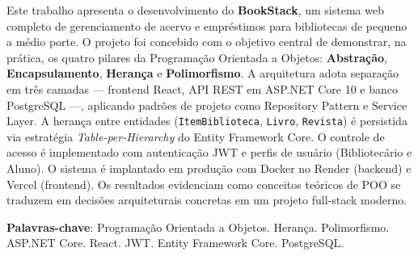 \documentclass[
  12pt,
  a4paper,
  oneside,
  brazil
]{abntex2}
\begin{document}
\frenchspacing
{}

\imprimircapa

\imprimirfolhaderosto

\begin{resumo}
Este trabalho apresenta o desenvolvimento do \textbf{BookStack}, um sistema web completo de gerenciamento de acervo e empréstimos para bibliotecas de pequeno a médio porte. O projeto foi concebido com o objetivo central de demonstrar, na prática, os quatro pilares da Programação Orientada a Objetos: \textbf{Abstração}, \textbf{Encapsulamento}, \textbf{Herança} e \textbf{Polimorfismo}. A arquitetura adota separação em três camadas — frontend React, API REST em ASP.NET Core 10 e banco PostgreSQL —, aplicando padrões de projeto como Repository Pattern e Service Layer. A herança entre entidades (\texttt{ItemBiblioteca}, \texttt{Livro}, \texttt{Revista}) é persistida via estratégia \textit{Table-per-Hierarchy} do Entity Framework Core. O controle de acesso é implementado com autenticação JWT e perfis de usuário (Bibliotecário e Aluno). O sistema é implantado em produção com Docker no Render (backend) e Vercel (frontend). Os resultados evidenciam como conceitos teóricos de POO se traduzem em decisões arquiteturais concretas em um projeto full-stack moderno.

\vspace{\onelineskip}

\noindent\textbf{Palavras-chave}: Programação Orientada a Objetos. Herança. Polimorfismo. ASP.NET Core. React. JWT. Entity Framework Core. PostgreSQL.
\end{resumo}
\end{document}
